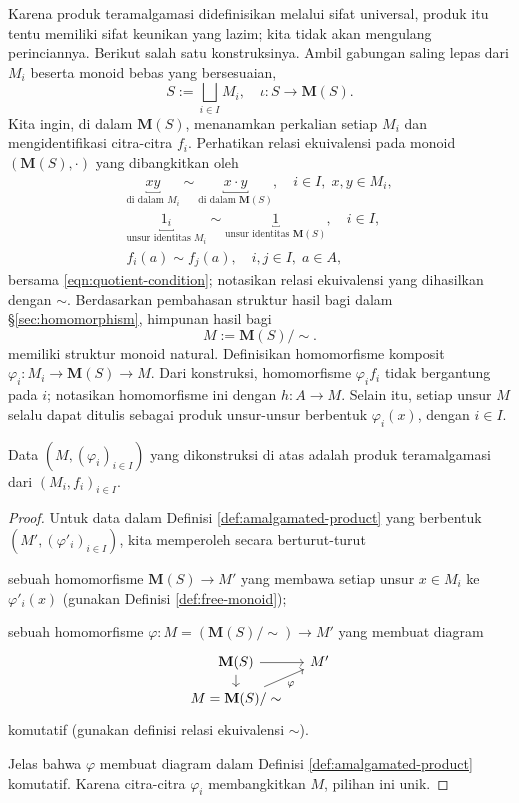 Karena produk teramalgamasi didefinisikan melalui sifat universal, produk itu tentu memiliki sifat keunikan yang lazim; kita tidak akan mengulang perinciannya. Berikut salah satu konstruksinya. Ambil gabungan saling lepas dari $M_i$ beserta monoid bebas yang bersesuaian,
\[ S :=  \bigsqcup_{i \in I} M_i, \quad \iota: S \to \mathbf{M}(S). \]
Kita ingin, di dalam $\mathbf{M}(S)$, menanamkan perkalian setiap $M_i$ dan mengidentifikasi citra-citra $f_i$. Perhatikan relasi ekuivalensi pada monoid $(\mathbf{M}(S), \cdot)$ yang dibangkitkan oleh
\begin{gather*}
	\underbracket{xy}_{\text{di dalam $M_i$}} \sim \underbracket{x \cdot y}_{\text{di dalam $\mathbf{M}(S)$}}, \quad i \in I, \; x,y \in M_i, \\
	\underbracket{1_i}_{\text{unsur identitas $M_i$}} \sim \underbracket{1}_{\text{unsur identitas $\mathbf{M}(S)$}}, \quad i \in I, \\
	f_i(a) \sim f_j(a), \quad i,j \in I, \; a \in A,
\end{gather*}
bersama \eqref{eqn:quotient-condition}; notasikan relasi ekuivalensi yang dihasilkan dengan $\sim$. Berdasarkan pembahasan struktur hasil bagi dalam \S\ref{sec:homomorphism}, himpunan hasil bagi
\[ M := \mathbf{M}(S)/\sim. \]
memiliki struktur monoid natural. Definisikan homomorfisme komposit $\varphi_i: M_i \to \mathbf{M}(S) \to M$. Dari konstruksi, homomorfisme $\varphi_i f_i$ tidak bergantung pada $i$; notasikan homomorfisme ini dengan $h: A \to M$. Selain itu, setiap unsur $M$ selalu dapat ditulis sebagai produk unsur-unsur berbentuk $\varphi_i(x)$, dengan $i \in I$.

\begin{lemma}
	Data $(M, (\varphi_i)_{i \in I})$ yang dikonstruksi di atas adalah produk teramalgamasi dari $(M_i, f_i)_{i \in I}$.
\end{lemma}
\begin{proof}
	Untuk data dalam Definisi \ref{def:amalgamated-product} yang berbentuk $(M' ,(\varphi'_i)_{i \in I})$, kita memperoleh secara berturut-turut
	\begin{compactenum}[(i)]
		\item sebuah homomorfisme $\mathbf{M}(S) \to M' $ yang membawa setiap unsur $x \in M_i$ ke $\varphi'_i(x)$ (gunakan Definisi \ref{def:free-monoid});
		\item sebuah homomorfisme $\varphi: M = (\mathbf{M}(S) /  \sim) \to M'$ yang membuat diagram
		\[\begin{tikzcd}[row sep=small, column sep=small]
			\mathbf{M}(S) \arrow[r] \arrow[d] & M' \\
			M=\mathbf{M}(S)/\sim \arrow[ru, "\varphi"']
		\end{tikzcd}\] komutatif (gunakan definisi relasi ekuivalensi $\sim$).
	\end{compactenum}
	Jelas bahwa $\varphi$ membuat diagram dalam Definisi \ref{def:amalgamated-product} komutatif. Karena citra-citra $\varphi_i$ membangkitkan $M$, pilihan ini unik.
\end{proof}

